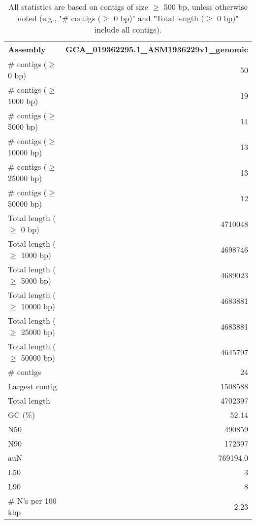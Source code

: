 \documentclass[12pt,a4paper]{article}
\begin{document}
\begin{table}[ht]
\begin{center}
\caption{All statistics are based on contigs of size $\geq$ 500 bp, unless otherwise noted (e.g., "\# contigs ($\geq$ 0 bp)" and "Total length ($\geq$ 0 bp)" include all contigs).}
\begin{tabular}{|l*{1}{|r}|}
\hline
Assembly & GCA\_019362295.1\_ASM1936229v1\_genomic \\ \hline
\# contigs ($\geq$ 0 bp) & 50 \\ \hline
\# contigs ($\geq$ 1000 bp) & 19 \\ \hline
\# contigs ($\geq$ 5000 bp) & 14 \\ \hline
\# contigs ($\geq$ 10000 bp) & 13 \\ \hline
\# contigs ($\geq$ 25000 bp) & 13 \\ \hline
\# contigs ($\geq$ 50000 bp) & 12 \\ \hline
Total length ($\geq$ 0 bp) & 4710048 \\ \hline
Total length ($\geq$ 1000 bp) & 4698746 \\ \hline
Total length ($\geq$ 5000 bp) & 4689023 \\ \hline
Total length ($\geq$ 10000 bp) & 4683881 \\ \hline
Total length ($\geq$ 25000 bp) & 4683881 \\ \hline
Total length ($\geq$ 50000 bp) & 4645797 \\ \hline
\# contigs & 24 \\ \hline
Largest contig & 1508588 \\ \hline
Total length & 4702397 \\ \hline
GC (\%) & 52.14 \\ \hline
N50 & 490859 \\ \hline
N90 & 172397 \\ \hline
auN & 769194.0 \\ \hline
L50 & 3 \\ \hline
L90 & 8 \\ \hline
\# N's per 100 kbp & 2.23 \\ \hline
\end{tabular}
\end{center}
\end{table}
\end{document}
